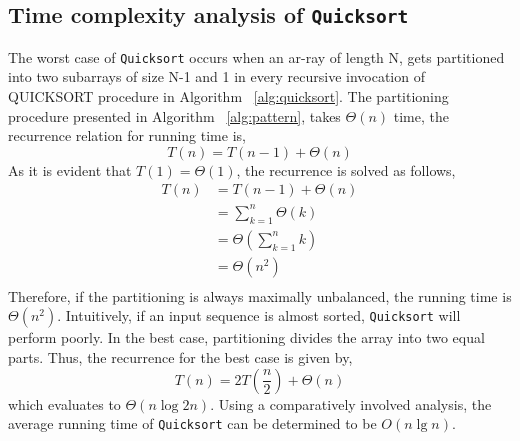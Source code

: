 \documentclass[a4paper, 11pt,twocolumn]{article}
\begin{document}
\subsection{Time complexity analysis of \texttt{Quicksort}}
The worst case of \texttt{Quicksort} occurs when an ar-ray of length N, gets partitioned into two subarrays of size N-1 and 1 in every recursive invocation of QUICKSORT procedure in Algorithm ~\ref{alg:quicksort}. The partitioning procedure presented in Algorithm ~\ref{alg:pattern}, takes $\Theta(n)$ time, the recurrence relation for running time is,
\begin{equation*}
T(n) = T(n-1) +\Theta(n)
\end{equation*}
As it is evident that $T(1) = \Theta (1)$, the recurrence is solved as follows,
\begin{align*}
T(n) &= T(n-1) + \Theta(n)\\
     &= \sum_{k=1}^n \Theta (k)\\
     &= \Theta \left( \sum_{k=1}^n k \right)\\
     &= \Theta (n^2) \\
\end{align*}
Therefore, if the partitioning is always maximally unbalanced, the running time is $\Theta (n^2)$. Intuitively, if an input sequence is almost sorted, \texttt{Quicksort} will perform poorly. In the best case, partitioning divides the array into two equal parts. Thus, the recurrence for the best case is given by,\\
\begin{equation*}
T(n) = 2T\left( \frac{n}{2} \right) +\Theta(n)
\end{equation*}
which evaluates to $\Theta (n \log{2}n)$. Using a comparatively involved analysis, the average running time of \texttt{Quicksort} can be determined to be $O(n \lg n)$.
\end{document}
